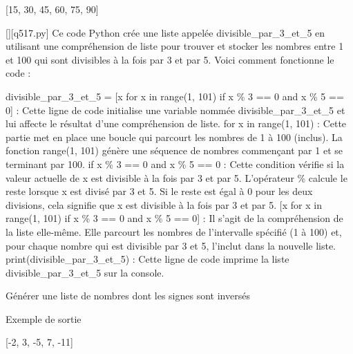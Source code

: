 [15, 30, 45, 60, 75, 90]
        \par
        \begin{solution}
            \renewcommand{\nomfichier}{q517.py}
            \pythonfile{\chemincode \nomfichier}[][\nomfichier]
            Ce code Python crée une liste appelée divisible\_par\_3\_et\_5 en utilisant une compréhension de liste pour trouver et stocker les nombres entre 1 et 100 qui sont divisibles à la fois par 3 et par 5. Voici comment fonctionne le code :

    divisible\_par\_3\_et\_5 = [x for x in range(1, 101) if x \% 3 == 0 and x \% 5 == 0] : Cette ligne de code initialise une variable nommée divisible\_par\_3\_et\_5 et lui affecte le résultat d'une compréhension de liste.
        for x in range(1, 101) : Cette partie met en place une boucle qui parcourt les nombres de 1 à 100 (inclus). La fonction range(1, 101) génère une séquence de nombres commençant par 1 et se terminant par 100.
        if x \% 3 == 0 and x \% 5 == 0 : Cette condition vérifie si la valeur actuelle de x est divisible à la fois par 3 et par 5. L'opérateur \% calcule le reste lorsque x est divisé par 3 et 5. Si le reste est égal à 0 pour les deux divisions, cela signifie que x est divisible à la fois par 3 et par 5.
        [x for x in range(1, 101) if x \% 3 == 0 and x \% 5 == 0] : Il s'agit de la compréhension de la liste elle-même. Elle parcourt les nombres de l'intervalle spécifié (1 à 100) et, pour chaque nombre qui est divisible par 3 et 5, l'inclut dans la nouvelle liste.
    print(divisible\_par\_3\_et\_5) : Cette ligne de code imprime la liste divisible\_par\_3\_et\_5 sur la console.
        \end{solution}
        

        \question
        Générer une liste de nombres dont les signes sont inversés

Exemple de sortie

[-2, 3, -5, 7, -11]

